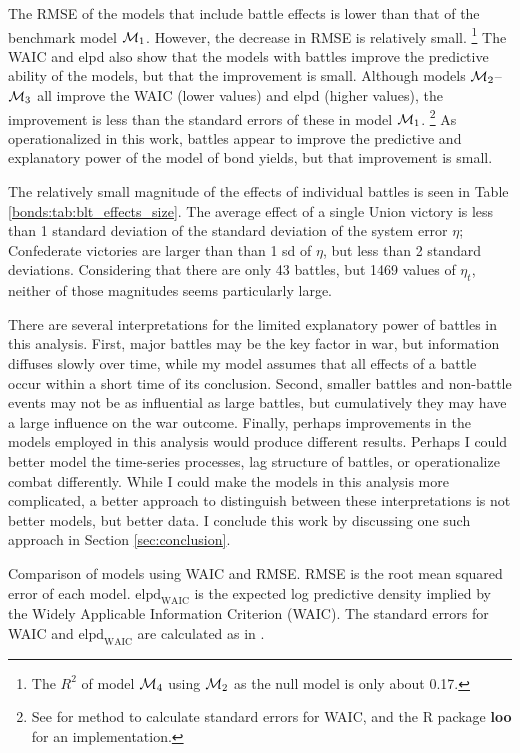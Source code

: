The  RMSE of the models that include battle effects is lower than that of the benchmark model $\mathcal{M}_{\text{1}}$. 
However, the decrease in  RMSE is relatively small.%
\footnote{The $R^{2}$ of model $\mathcal{M}_{\text{4}}$ using $\mathcal{M}_{\text{2}}$ as the null model is only about 0.17.}
The WAIC and elpd also show that the models with battles improve the predictive ability of the models, but that the improvement is small.
Although models $\mathcal{M}_{\text{2}}$--$\mathcal{M}_{\text{3}}$ all improve the WAIC (lower values) and elpd (higher values), the improvement is less than the standard errors of these  in model $\mathcal{M}_{\text{1}}$.%
\footnote{See \textcite{GelmanVehtari2014a} for method to calculate standard errors for WAIC, and the R package \textbf{loo} for an implementation.}
As operationalized in this work, battles appear to improve the predictive and explanatory power of the model of bond yields, but that improvement is small.

The relatively small magnitude of the effects of individual battles is seen in Table \ref{bonds:tab:blt_effects_size}.
The average effect of a single Union victory is less than 1 standard deviation of the standard deviation of the system error $\eta$; Confederate victories are larger than than 1 sd of $\eta$, but less than 2 standard deviations.
Considering that there are only 43 battles, but 1469 values of $\eta_{t}$, neither of those magnitudes seems particularly large.

There are several interpretations for the limited explanatory power of battles in this analysis.
First, major battles may be the key factor in war, but information diffuses slowly over time, while my model assumes that all effects of a battle occur within a short time of its conclusion.
Second, smaller battles and non-battle events may not be as influential as large battles, but cumulatively they may have a large influence on the war outcome.
Finally, perhaps improvements in the models employed in this analysis would produce different results.
Perhaps I could better model the time-series processes, lag structure of battles, or operationalize combat differently.
While I could make the models in this analysis more complicated, a better approach to distinguish between these interpretations is not better models, but better data.
I conclude this work by discussing one such approach in Section \ref{sec:conclusion}.

\begin{table}[!htpb]
  \centering
  
  \caption[Comparison of models using WAIC and RMSE]{
    Comparison of models using WAIC and RMSE.
    RMSE is the root mean squared error of each model.
    $\text{elpd}_{\text{WAIC}}$ is the expected log predictive density implied by the Widely Applicable Information Criterion (WAIC).
    The standard errors for WAIC and $\text{elpd}_{\text{WAIC}}$ are calculated as in \textcite{GelmanVehtari2014a}.
  }
  \label{bonds:tab:waic}
\end{table}

